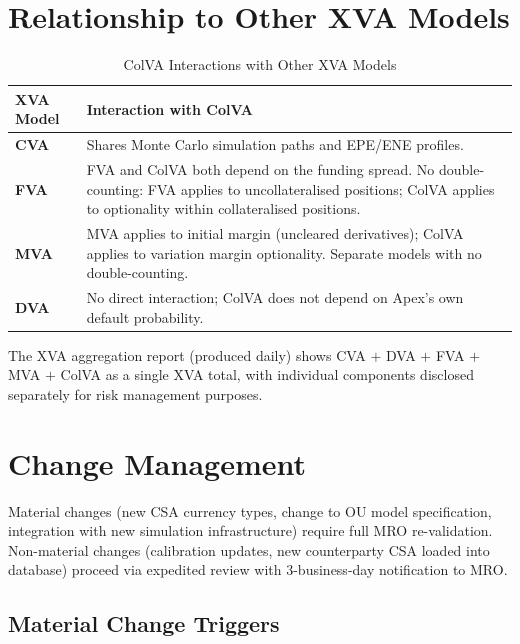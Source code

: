 \documentclass[11pt,a4paper]{article}
\begin{document}
\section{Relationship to Other XVA Models}

\begin{table}[h!]
\centering
\caption{ColVA Interactions with Other XVA Models}
\begin{tabular}{@{}lp{10cm}@{}}
\toprule
\textbf{XVA Model} & \textbf{Interaction with ColVA} \\
\midrule
\textbf{CVA} & Shares Monte Carlo simulation paths and EPE/ENE profiles. \\[4pt]
\textbf{FVA} & FVA and ColVA both depend on the funding spread. No double-counting: FVA applies to uncollateralised positions; ColVA applies to optionality within collateralised positions. \\[4pt]
\textbf{MVA} & MVA applies to initial margin (uncleared derivatives); ColVA applies to variation margin optionality. Separate models with no double-counting. \\[4pt]
\textbf{DVA} & No direct interaction; ColVA does not depend on Apex's own default probability. \\
\bottomrule
\end{tabular}
\end{table}

The XVA aggregation report (produced daily) shows CVA $+$ DVA $+$ FVA $+$ MVA $+$ ColVA as a
single XVA total, with individual components disclosed separately for risk management purposes.

\section{Change Management}

Material changes (new CSA currency types, change to OU model specification, integration with
new simulation infrastructure) require full MRO re-validation. Non-material changes
(calibration updates, new counterparty CSA loaded into database) proceed via expedited review
with 3-business-day notification to MRO.

\subsection{Material Change Triggers}
\end{document}
